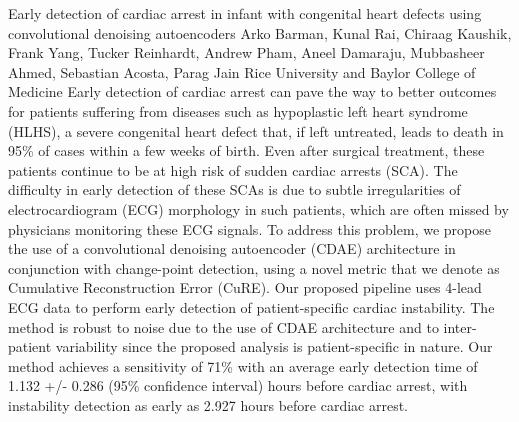 \vspace{1.5ex}
\abs
{Early detection of cardiac arrest in infant with congenital heart defects using convolutional denoising autoencoders}
{Arko Barman, Kunal Rai, Chiraag Kaushik, Frank Yang, Tucker Reinhardt, Andrew Pham, Aneel Damaraju, Mubbasheer Ahmed, Sebastian Acosta, Parag Jain}
{Rice University and Baylor College of Medicine}
{Early detection of cardiac arrest can pave the way to better outcomes for patients suffering from diseases such as hypoplastic left heart syndrome (HLHS), a severe congenital heart defect that, if left untreated, leads to death in 95\% of cases within a few weeks of birth. Even after surgical treatment, these patients continue to be at high risk of sudden cardiac arrests (SCA). The difficulty in early detection of these SCAs is due to subtle irregularities of electrocardiogram (ECG) morphology in such patients, which are often missed by physicians monitoring these ECG signals. To address this problem, we propose the use of a convolutional denoising autoencoder (CDAE) architecture in conjunction with change-point detection, using a novel metric that we denote as Cumulative Reconstruction Error (CuRE). Our proposed pipeline uses 4-lead ECG data to perform early detection of patient-specific cardiac instability. The method is robust to noise due to the use of CDAE architecture and to inter-patient variability since the proposed analysis is patient-specific in nature. Our method achieves a sensitivity of 71\% with an average early detection time of 1.132 +/- 0.286 (95\% confidence interval) hours before cardiac arrest, with instability detection as early as 2.927 hours before cardiac arrest.}


